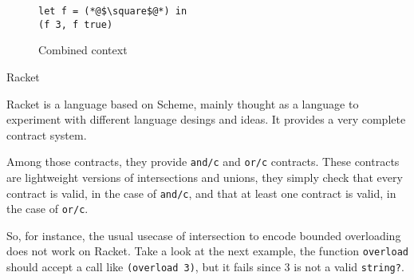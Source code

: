 \documentclass[sigplan,10pt,review,anonymous]{acmart}
\newcommand{\unsure}[2][1=]{}
\newcommand{\resolved}[2]{}
\newcommand{\racket}[1]{\lstinline[language=racket]{#1}}
\begin{document}
\begin{figure}[h]
\begin{lstlisting}[language=nickel]
let f = (*@$\square$@*) in
(f 3, f true)
\end{lstlisting}
\caption{Combined context}
\label{fig:invalid-context}
\end{figure}





\resolved{(Yann) Maybe adding a concrete example of this (it can be the same term but with
    concrete types like Number and String and simple contexts like application
    to a dumb argument) is sufficient to make the point}

\subsection{Racket}
\label{sec:racket}

\unsure{WARNING: what is below is being reworked by Yann}

Racket is a language based on Scheme, mainly thought as a language to experiment
with different language desings and ideas. It provides a very complete contract
system\cite{RacketContracts}.

Among those contracts, they provide \racket{and/c} and \racket{or/c} contracts.
These contracts are lightweight versions of intersections and unions, they simply
check that every contract is valid, in the case of \racket{and/c},
and that at least one contract
is valid, in the case of \racket{or/c}.

So, for instance, the usual usecase of intersection to encode bounded overloading
does not work on Racket. Take a look at the next example, the function
\racket{overload} should accept a call like \racket{(overload 3)}, but it fails
since 3 is not a valid \racket{string?}.
\end{document}
